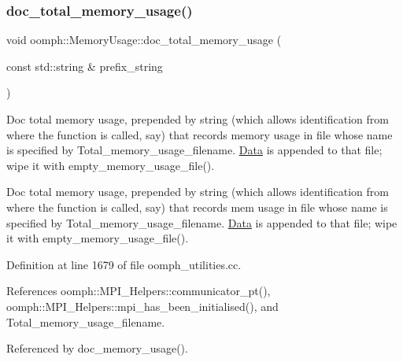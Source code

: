 \mbox{\label{namespaceoomph_1_1MemoryUsage_a216dececd7087625de8e2211216cd861}} 
\subsubsection{\texorpdfstring{doc\+\_\+total\+\_\+memory\+\_\+usage()}{doc\_total\_memory\_usage()}}
{\footnotesize\ttfamily void oomph\+::\+Memory\+Usage\+::doc\+\_\+total\+\_\+memory\+\_\+usage (\begin{DoxyParamCaption}\item[{const std\+::string \&}]{prefix\+\_\+string }\end{DoxyParamCaption})}



Doc total memory usage, prepended by string (which allows identification from where the function is called, say) that records memory usage in file whose name is specified by Total\+\_\+memory\+\_\+usage\+\_\+filename. \hyperlink{classoomph_1_1Data}{Data} is appended to that file; wipe it with empty\+\_\+memory\+\_\+usage\+\_\+file(). 

Doc total memory usage, prepended by string (which allows identification from where the function is called, say) that records mem usage in file whose name is specified by Total\+\_\+memory\+\_\+usage\+\_\+filename. \hyperlink{classoomph_1_1Data}{Data} is appended to that file; wipe it with empty\+\_\+memory\+\_\+usage\+\_\+file(). 

Definition at line 1679 of file oomph\+\_\+utilities.\+cc.



References oomph\+::\+M\+P\+I\+\_\+\+Helpers\+::communicator\+\_\+pt(), oomph\+::\+M\+P\+I\+\_\+\+Helpers\+::mpi\+\_\+has\+\_\+been\+\_\+initialised(), and Total\+\_\+memory\+\_\+usage\+\_\+filename.



Referenced by doc\+\_\+memory\+\_\+usage().

\mbox{\label{namespaceoomph_1_1MemoryUsage_a47bde23694eeafe80bdcffb3aaeb07a5}} 
